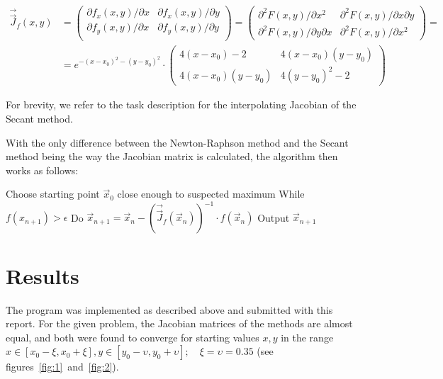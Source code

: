 \documentclass[11pt,a4paper]{article}
\begin{document}
\begin{equation}
	\begin{array}{lll}
	\vec{\vec{J}}_f(x,y)
	& =
	\begin{pmatrix}
		\partial f_x(x,y)/ \partial x & \partial f_x(x,y)/ \partial y \\
		\partial f_y(x,y)/ \partial x & \partial f_y(x,y)/ \partial y \\
	\end{pmatrix}
	 =
	\begin{pmatrix}
		\partial^2 F(x,y) / \partial x^2 & \partial^2 F(x,y) / \partial x \partial y \\
		\partial^2 F(x,y) / \partial y \partial x & \partial^2 F(x,y) / \partial x^2 
	\end{pmatrix}
	= \\
	& =
	e^{-(x - x_0)^2 -(y -y_0)^2} \cdot  
	\begin{pmatrix}
	4(x - x_0) - 2 & 4(x-x_0)(y-y_0) \\
	4(x - x_0)(y - y_0) & 4(y - y_0)^2 - 2	
	\end{pmatrix}
\end{array}
	\label{eqn:2}
\end{equation}

For brevity, we refer to the task description for the interpolating Jacobian of 
the Secant method.

With the only difference between the Newton-Raphson method and the Secant method
being the way the Jacobian matrix is calculated, the algorithm then works as follows:
\begin{outline}
\1 Choose starting point $\vec{x}_0$ close enough to suspected maximum
\1 While $f(x_{n+1}) > \epsilon$
	\2 Do $\vec{x}_{n+1} = \vec{x}_n - (\vec{\vec{J}}_f(\vec{x}_n))^{-1} \cdot f(\vec{x}_n)$
\1 Output $\vec{x}_{n+1}$
\end{outline}
\section{Results}

The program was implemented as described above and submitted with this report. 
For the given problem, the Jacobian matrices of the methods are almost equal,
and both were found to converge for starting values $x,y$ in the range $x \in [x_0 - \xi, x_0 + \xi ], y \in [y_0 - \upsilon, y_0 + \upsilon]; \quad \xi=\upsilon=0.35$ 
(see figures~\ref{fig:1}~and~\ref{fig:2}).
\end{document}
